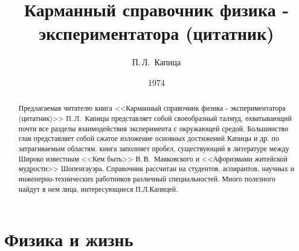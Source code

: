 \documentclass[12pt,a4paper,titlepage]{article}
\begin{document}
\author{П.\,Л.~Капица}
\title{Карманный справочник физика - экспериментатора (цитатник)}
\date{1974}
\maketitle

\begin{abstract}
Предлагаемая читателю книга <<Карманный справочник физика - экспериментатора (цитатник)>> П.\,Л.~Капицы представляет собой своеобразный талмуд, охватывающий почти все разделы взаимодействия эксперимента с окружающей средой.
Большинство глав представляет собой сжатое изложение основных достижений Капицы и др. по затрагиваемым областям. книга заполняет пробел, существующий в литературе между Широко известным <<Кем быть>> В.\,В.~Маяковского и <<Афоризмами житейской мудрости>> Шопенгауэра.
Справочник рассчитан на студентов, аспирантов, научных и инженерно-технических работников различный специальностей. Много полезного найдут в нем лица, интересующиеся П.Л.Капицей.
\end{abstract}

\tableofcontents
\newpage

\section{Физика и жизнь}
\end{document}

